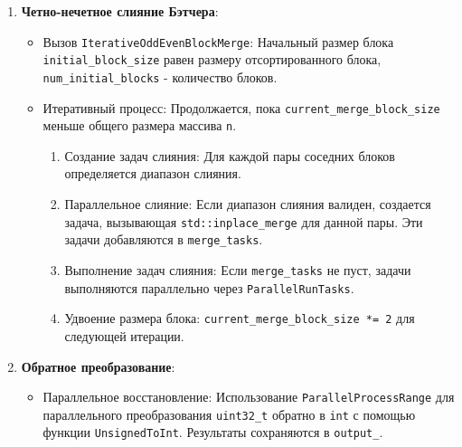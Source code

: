 \documentclass[12pt,a4paper]{extarticle}
\begin{document}
\begin{enumerate}
    \item \textbf{Четно-нечетное слияние Бэтчера}:
    \begin{itemize}
        \item Вызов \texttt{IterativeOddEvenBlockMerge}: Начальный размер блока \texttt{initial\_block\_size} равен размеру отсортированного блока, \texttt{num\_initial\_blocks} - количество блоков.
        \item Итеративный процесс: Продолжается, пока \texttt{current\_merge\_block\_size} меньше общего размера массива \texttt{n}.
        \begin{enumerate}
            \item Создание задач слияния: Для каждой пары соседних блоков определяется диапазон слияния.
            \item Параллельное слияние: Если диапазон слияния валиден, создается задача, вызывающая \texttt{std::inplace\_merge} для данной пары. Эти задачи добавляются в \texttt{merge\_tasks}.
            \item Выполнение задач слияния: Если \texttt{merge\_tasks} не пуст, задачи выполняются параллельно через \texttt{ParallelRunTasks}.
            \item Удвоение размера блока: \texttt{current\_merge\_block\_size *= 2} для следующей итерации.
        \end{enumerate}
    \end{itemize}
    
    \item \textbf{Обратное преобразование}:
    \begin{itemize}
        \item Параллельное восстановление: Использование \texttt{ParallelProcessRange} для параллельного преобразования \texttt{uint32\_t} обратно в \texttt{int} с помощью функции \texttt{UnsignedToInt}. Результаты сохраняются в \texttt{output\_}.
    \end{itemize}
\end{enumerate}
\end{document}
